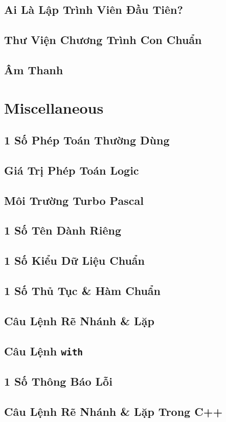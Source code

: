 \documentclass[oneside]{book}
\numberwithin{equation}{section}
\begin{document}
\section{Ai Là Lập Trình Viên Đầu Tiên?}

\section{Thư Viện Chương Trình Con Chuẩn}

\section{Âm Thanh}


\appendix

\chapter{Miscellaneous}

\section{1 Số Phép Toán Thường Dùng}

\section{Giá Trị Phép Toán Logic}

\section{Môi Trường Turbo Pascal}

\section{1 Số Tên Dành Riêng}

\section{1 Số Kiểu Dữ Liệu Chuẩn}

\section{1 Số Thủ Tục \& Hàm Chuẩn}

\section{Câu Lệnh Rẽ Nhánh \& Lặp}

\section{Câu Lệnh \texttt{with}}

\section{1 Số Thông Báo Lỗi}

\section{Câu Lệnh Rẽ Nhánh \& Lặp Trong C++}


\printbibliography[heading=bibintoc]
	
\end{document}
